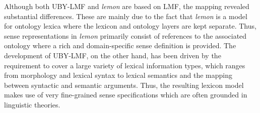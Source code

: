 Although both UBY-LMF and \emph{lemon} are based on LMF, the mapping revealed substantial differences. These are mainly due to the fact that 
\emph{lemon} is a model for ontology lexica where the lexicon and ontology layers are kept separate. Thus, sense representations in \emph{lemon} primarily consist of references to the associated ontology
where a rich and domain-specific sense definition is provided. 
The development of UBY-LMF, on the other hand, has been driven by the requirement to cover a large variety of
 lexical information types, which ranges from morphology and lexical syntax to lexical semantics and the mapping between syntactic and semantic arguments. 
Thus, the resulting lexicon model makes use of very fine-grained sense specifications which are often grounded in linguistic theories.


